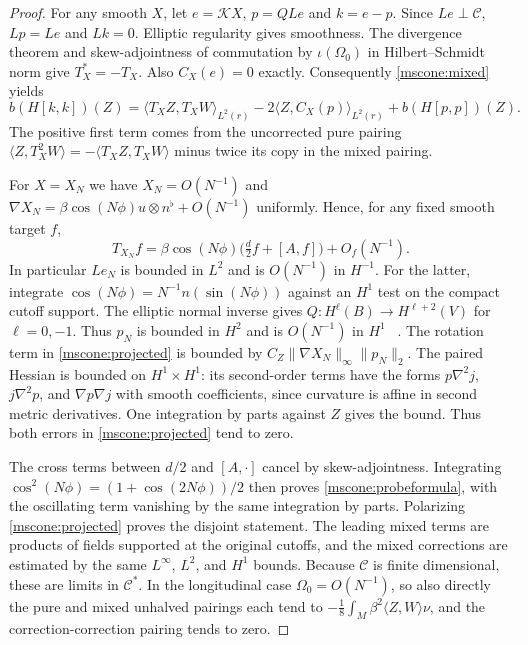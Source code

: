 \documentclass[11pt]{article}
\numberwithin{equation}{section}
\theoremstyle{definition}
\theoremstyle{remark}
\begin{document}
\begin{proof}
For any smooth \(X\), let \(e=\mathcal K X\), \(p=QLe\) and
\(k=e-p\). Since \(Le\perp\mathcal C\), \(Lp=Le\) and \(Lk=0\).
Elliptic regularity gives smoothness. The divergence theorem and
skew-adjointness of commutation by \(\iota(\Omega_0)\) in
Hilbert--Schmidt norm give \(T_X^*=-T_X\). Also \(C_X(e)=0\)
exactly. Consequently \eqref{mscone:mixed} yields
\begin{equation}\label{mscone:projected}
 b(H[k,k])(Z)
 =\langle T_XZ,T_XW\rangle_{L^2(r)}
   -2\langle Z,C_X(p)\rangle_{L^2(r)}+b(H[p,p])(Z).
\end{equation}
The positive first term comes from the uncorrected pure pairing
\(\langle Z,T_X^2W\rangle=-\langle T_XZ,T_XW\rangle\)
minus twice its copy in the mixed pairing.

For \(X=X_N\) we have \(X_N=O(N^{-1})\) and
\(\nabla X_N=\beta\cos(N\phi)u\otimes n^\flat+O(N^{-1})\)
uniformly. Hence, for any fixed smooth target \(f\),
\[
 T_{X_N}f=\beta\cos(N\phi)\big(\tfrac d2 f+[A,f]\big)+O_f(N^{-1}).
\]
In particular \(Le_N\) is bounded in \(L^2\) and is \(O(N^{-1})\)
in \(H^{-1}\). For the latter, integrate
\(\cos(N\phi)=N^{-1}n(\sin(N\phi))\) against an \(H^1\) test on
the compact cutoff support. The elliptic normal inverse gives
\(Q:H^\ell(B)\to H^{\ell+2}(V)\) for \(\ell=0,-1\).
Thus \(p_N\) is bounded in \(H^2\) and is \(O(N^{-1})\) in \(H^1\)
~\cite[(1)--(2)]{Melrose2017Lecture22}. The rotation term in
\eqref{mscone:projected} is bounded by
\(C_Z\|\nabla X_N\|_\infty\|p_N\|_2\). The paired Hessian is
bounded on \(H^1\times H^1\): its second-order terms have the
forms \(p\nabla^2j\), \(j\nabla^2p\), and \(\nabla p\nabla j\)
with smooth coefficients, since curvature is affine in second
metric derivatives. One integration by parts against \(Z\) gives
the bound. Thus both errors in \eqref{mscone:projected} tend to zero.

The cross terms between \(d/2\) and \([A,\cdot]\) cancel by
skew-adjointness. Integrating \(\cos^2(N\phi)=(1+\cos(2N\phi))/2\)
then proves \eqref{mscone:probeformula}, with the oscillating term
vanishing by the same integration by parts. Polarizing
\eqref{mscone:projected} proves the disjoint statement. The leading
mixed terms are products of fields supported at the original
cutoffs, and the mixed corrections are estimated by the same
\(L^\infty\), \(L^2\), and \(H^1\) bounds. Because \(\mathcal C\)
is finite dimensional, these are limits in \(\mathcal C^*\).
In the longitudinal case \(\Omega_0=O(N^{-1})\), so also directly
the pure and mixed unhalved pairings each tend to
\(-\tfrac18\int_M\beta^2\langle Z,W\rangle\nu\), and the
correction-correction pairing tends to zero.
\end{proof}
\end{document}
